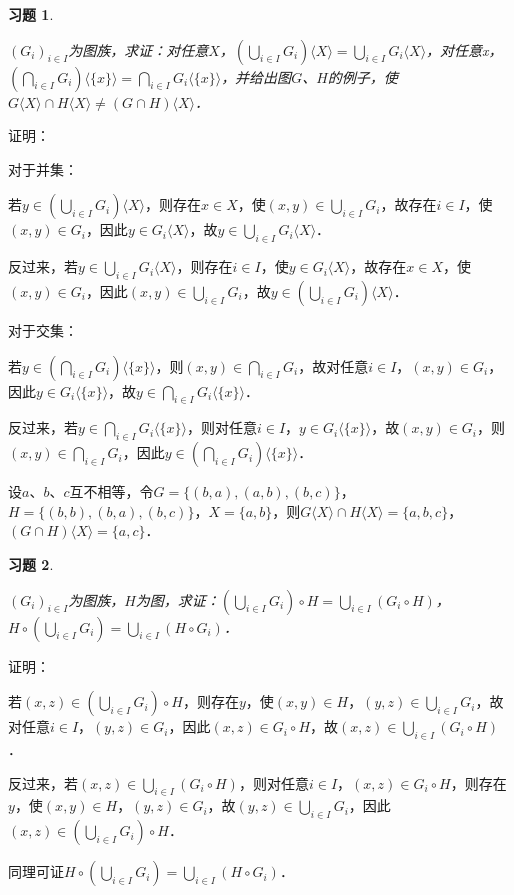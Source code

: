 \documentclass[12pt, a4paper, oneside]{book}
\newtheorem{exer}{习题}
\begin{document}
			\begin{exer}\label{exer57}
				\hfill\par
				$(G_i)_{i\in I}$为图族，求证：对任意$X$，$(\bigcup\limits_{i\in I}G_i)\langle X \rangle =\bigcup\limits_{i\in I}G_i\langle X \rangle $，对任意x，$(\bigcap\limits_{i\in I}G_i)\langle \{x\} \rangle =\bigcap\limits_{i\in I}G_i\langle \{x\} \rangle $，并给出图$G$、$H$的例子，使$G\langle X \rangle \cap H\langle X \rangle \neq (G\cap H)\langle X \rangle $．
			\end{exer}
			证明：
			\par
			对于并集：
			\par
			若$y\in (\bigcup\limits_{i\in I}G_i)\langle X \rangle $，则存在$x\in X$，使$(x, y)\in \bigcup\limits_{i\in I}G_i$，故存在$i\in I$，使$(x, y)\in G_i$，因此$y\in G_i\langle X \rangle $，故$y\in \bigcup\limits_{i\in I}G_i\langle X \rangle $．
			\par
			反过来，若$y\in \bigcup\limits_{i\in I}G_i\langle X \rangle $，则存在$i\in I$，使$y\in G_i\langle X \rangle $，故存在$x\in X$，使$(x, y)\in G_i$，因此$(x, y)\in \bigcup\limits_{i\in I}G_i$，故$y\in (\bigcup\limits_{i\in I}G_i)\langle X \rangle $．
			\par
			对于交集：
			\par
			若$y\in (\bigcap\limits_{i\in I}G_i)\langle \{x\} \rangle $，则$(x, y)\in \bigcap\limits_{i\in I}G_i$，故对任意$i\in I$，$(x, y)\in G_i$，因此$y\in G_i\langle \{x\} \rangle $，故$y\in \bigcap\limits_{i\in I}G_i\langle \{x\} \rangle $．
			\par
			反过来，若$y\in \bigcap\limits_{i\in I}G_i\langle \{x\} \rangle $，则对任意$i\in I$，$y\in G_i\langle \{x\} \rangle $，故$(x, y)\in G_i$，则$(x, y)\in \bigcap\limits_{i\in I}G_i$，因此$y\in (\bigcap\limits_{i\in I}G_i)\langle \{x\} \rangle $．
			\par
			设$a$、$b$、$c$互不相等，令$G=\{(b, a), (a, b), (b, c)\}$，$H=\{(b, b), (b, a), (b, c)\}$，$X=\{a, b\}$，则$G\langle X \rangle \cap H\langle X \rangle =\{a, b, c\}$，$(G\cap H)\langle X \rangle =\{a, c\}$．
			
			\begin{exer}\label{exer58}
				\hfill\par
				$(G_i)_{i\in I}$为图族，$H$为图，求证：$(\bigcup\limits_{i\in I}G_i)\circ H=\bigcup\limits_{i\in I}(G_i\circ H)$，$H\circ (\bigcup\limits_{i\in I}G_i)=\bigcup\limits_{i\in I}(H\circ G_i)$．
			\end{exer}
			证明：
			\par
			若$(x, z)\in (\bigcup\limits_{i\in I}G_i)\circ H$，则存在$y$，使$(x, y)\in H$，$(y, z)\in \bigcup\limits_{i\in I}G_i$，故对任意$i\in I$，$(y, z)\in G_i$，因此$(x, z)\in G_i\circ H$，故$(x, z)\in \bigcup\limits_{i\in I}(G_i\circ H)$．
			\par
			反过来，若$(x, z)\in \bigcup\limits_{i\in I}(G_i\circ H)$，则对任意$i\in I$，$(x, z)\in G_i\circ H$，则存在$y$，使$(x, y)\in H$，$(y, z)\in G_i$，故$(y, z)\in \bigcup\limits_{i\in I}G_i$，因此$(x, z)\in (\bigcup\limits_{i\in I}G_i)\circ H$．
			\par
			同理可证$H\circ (\bigcup\limits_{i\in I}G_i)=\bigcup\limits_{i\in I}(H\circ G_i)$．
			
\end{document}
